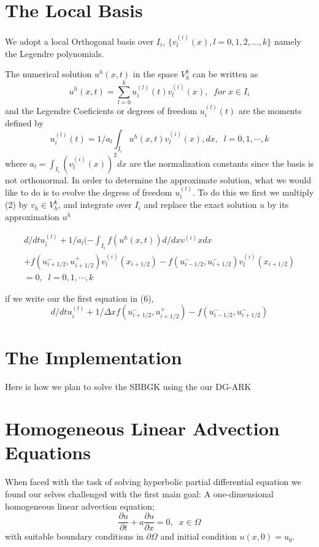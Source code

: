 \documentclass[11pt,fleqn]{report}
\begin{document}
\section{The Local Basis}
We adopt a local Orthogonal basis over $I_i$, $\{v_l^{(i)}(x), l=0,1,2, \dots, k\}$ namely the Legendre polynomials.

The numerical solution $u^h(x,t)$ in the space $V_h^k$ can be written as
\begin{equation}
 u^h(x,t) = \sum_{l=0}^{k} u_i^{(l)}(t)v_l^({i})(x), \; \; for \; x \in I_i
\end{equation}
and the Legendre Coeficients or degrees of freedom $u_i^{(l)}(t)$ are the moments defined by
\begin{equation}
 u_i^{(l)}(t) = 1/a_l \int_{I_i} u^h(x,t)v_l^{(i)}(x),dx, \; \; l = 0,1, \cdots,k
\end{equation}
where $a_l = \int_{I_i} (v_l^{(i)}(x))^2 dx$ are the normalization constants since the basis is not orthonormal. In order to determine the approximate solution, what we would like to do is to evolve the degress of freedom $u_i^{(l)}$. To do this we first we multiply (2) by $v_h \in V_h^k$, and integrate over $I_i$ and replace the exact solution $u$ by its approximation $u^h$

\begin{eqnarray}
 d/dt u_i^{(l)} + 1/a_l(-\int_{I_i} f(u^h(x,t))d/dx v^{(i)}x dx \\ \nonumber
 	+ f(u_{i+1/2}^{-},u_{i+1/2}^{+})v_l^{(i)}(x_{i+1/2}) 
 	- f(u_{i-1/2}^{-},u_{i+1/2}^{-})v_l^{(i)}(x_{i+1/2}) \\ \nonumber
	= 0, \; \;  l = 0,1, \cdots ,k
\end{eqnarray}

if we write our the first equation in (6),
\begin{equation}
 d/dt u_i^{(l)} + 1/{\Delta x}f(u_{i+1/2}^{-},u_{i+1/2}^{+})
 	- f(u_{i-1/2}^{-},u_{i+1/2}^{-})
\end{equation}

\section{The Implementation}
Here is how we plan to solve the SBBGK using the our DG-ARK

\section{Homogeneous Linear Advection Equations}
When faced with the task of solving hyperbolic partial differential equation we found our selves challenged with the first main goal: A one-dimensional homogeneous linear advection equation;
\begin{equation}
	\frac{\partial u}{\partial t} + a \frac{\partial u}{\partial x} = 0, \;\; x \in \Omega
	\label{homo_advection}
\end{equation}
with suitable boundary conditions in $\partial \Omega$ and initial condition $u(x,0) = u_0$.
\end{document}
